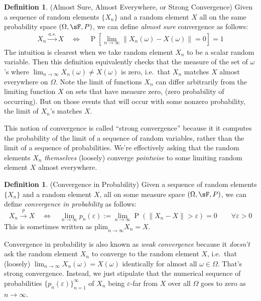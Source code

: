 \documentclass[12pt]{article}
\theoremstyle{plain}
\theoremstyle{definition}
\newtheorem{defn}[thm]{Definition}
\theoremstyle{remark}
\newcommand{\Prb}{\operatorname{P}}
\newcommand{\asto}{\xrightarrow{a.s.}}
\newcommand{\pto}{\xrightarrow{p}}
\newcommand{\plim}{\text{plim}_{n\rightarrow\infty}}
\newcommand{\ninf}{_{n=1}^\infty}
\newcommand{\limn}{\lim_{n\rightarrow\infty}}
\begin{document}
\begin{defn}{(Almost Sure, Almost Everywhere, or Strong Convergence)}
Given a sequence of random elements $\{X_n\}$ and a random element $X$
all on the same probability space $(\Omega,\sF,P)$, we can define
\emph{almost sure} convergence as follows:
\begin{align*}
  X_n\asto X
  \quad \iff \quad
  \Prb\left[\limn \lVert X_n(\omega) - X(\omega)\rVert = 0\right]
  = 1
\end{align*}
The intuition is clearest when we take random element $X_n$ to be a
scalar random variable.
Then this definition equivalently checks that the measure of the set of
$\omega$'s where $\limn X_n(\omega)\neq X(\omega)$ is zero, i.e.\ that
$X_n$ matches $X$ almost everywhere on $\Omega$.
Note the limit of functions $X_n$ can differ arbitrarily from the
limiting function $X$ on sets that have measure zero,
(zero probability of occurring). But on those events that will occur
with some nonzero probability, the limit of $X_n$'s matches $X$.

This notion of convergence is called ``strong convergence'' because it
it computes the probability of the limit of a sequence of random
variables, rather than the limit of a sequence of probabilities. We're
effectively asking that the random elements $X_n$ \emph{themselves}
(loosely) converge \emph{pointwise} to some limiting random element $X$
almost everywhere.
\end{defn}


\begin{defn}{(Convergence in Probability)}
Given a sequence of random elements $\{X_n\}$ and a random element $X$,
all on some measure space $(\Omega,\sF,P)$, we can define
\emph{convergence in probability} as follows:
\begin{equation}
  \label{plim}
  X_n\pto X
  \quad\iff\quad
  \limn p_n(\varepsilon) :=
  \limn
  \Prb\left(\lVert X_n - X \rVert > \varepsilon\right) = 0
  \qquad \forall  \varepsilon> 0
\end{equation}
This is sometimes written as $\plim X_n = X$.

Convergence in probability is also known as \emph{weak convergence}
because it \emph{doesn't} ask the random element $X_n$ to converge to
the random element $X$, i.e.\ that (loosely)
$\limn X_n(\omega)=X(\omega)$ identically for almost all
$\omega\in\Omega$.
That's strong convergence.
Instead, we just stipulate that the numerical sequence of probabilities
$\{p_n(\varepsilon)\}\ninf$ of $X_n$ being $\varepsilon$-far from $X$
over all $\Omega$ goes to zero as $n\rightarrow\infty$.
\end{defn}
\end{document}
